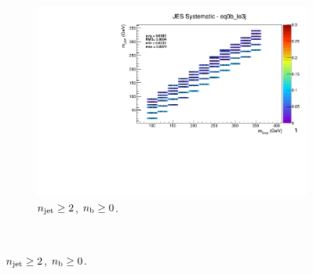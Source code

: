 \begin{figure}[ht!]
\begin{subfigure}[b]{0.32\textwidth}
    \includegraphics[width=\textwidth, page=1]{Figs/sms/t2cc/v37_3/systs/T2cc_JES_eq0b_le3j.pdf}
    \caption{$n_{\text{jet}} \geq 2$, $n_{\text{b}} \geq 0$.}
    \label{fig:sms-jes-t2cc-ge2j-ge0b}
  \end{subfigure}\\ %

\end{figure}
